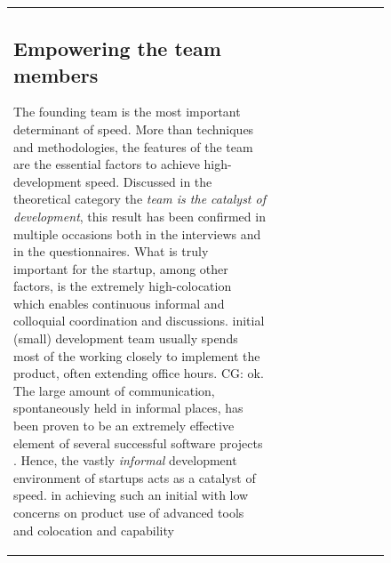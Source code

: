 \documentclass[12pt,journal,compsoc]{../sty/IEEEtran}
\begin{document}
\begin{table}[!t]
\begin{figure}[!t]
\begin{compactitem}
\begin{table}[!t]
\begin{tabular}{|l||c||c||c||c||c||c||c||c||c|}
\subsection{Empowering the team members} The founding team is the most important
determinant of speed. More than  techniques and methodologies, the features of
the team are the essential factors  to achieve high-development speed. Discussed
in the theoretical category the  \textit{team is the catalyst of development},
this result has been confirmed in  multiple occasions both in the interviews and
in the questionnaires. What is  truly important for the startup, among other
factors, is the extremely  high-colocation which enables continuous informal and
colloquial coordination  and discussions.  %
initial (small) development team usually spends most of the  %
working closely to implement the product, often extending  %
office hours. CG: ok. The large amount of communication, spontaneously held in
informal places, has  been proven to be an extremely effective element of
several successful software projects \cite{Highsmith2000}. Hence, the vastly
\textit{informal} development environment of startups acts as a catalyst of
speed. %
in achieving such an initial  %
with low concerns on product  %
use of advanced tools and  %
colocation and capability  %


\end{tabular}
\end{table}
\end{compactitem}
\end{figure}
\end{table}
\end{document}
